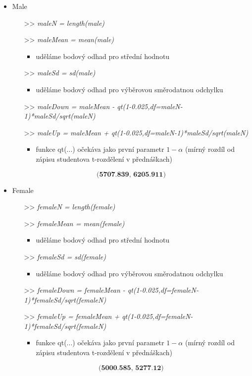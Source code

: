 \documentclass[paper=a4, fontsize=12pt]{scrartcl}
\numberwithin{equation}{section}		%
\numberwithin{figure}{section}			%
\numberwithin{table}{section}				%
\begin{document}
\begin{itemize}
	\item Male
	\begin{itemize}
		\item[>>]\textit{ maleN = length(male)}
		\item[>>]\textit{ maleMean = mean(male)}
		\begin{itemize}
			\item uděláme bodový odhad pro střední hodnotu	
		\end{itemize}
		\item[>>]\textit{ maleSd = sd(male)}
		\begin{itemize}
			\item uděláme bodový odhad pro výběrovou směrodatnou odchylku 
		\end{itemize}
		\item[>>]\textit{maleDown = maleMean - qt(1-0.025,df=maleN-1)*maleSd/sqrt(maleN)} 
		\item[>>]\textit{ maleUp = maleMean + qt(1-0.025,df=maleN-1)*maleSd/sqrt(maleN)}
		\begin{itemize}
			\item funkce qt(...) očekáva jako první parametr \(1 - \alpha\) (mírný rozdíl od zápisu studentova t-rozdělení v přednáškach)    
		\end{itemize}
	\end{itemize}
	
	\[
	 \textbf{(5707.839, 6205.911)}
	\]

	\item Female
	\begin{itemize}
	\item[>>]\textit{ femaleN = length(female)}
	\item[>>]\textit{ femaleMean = mean(female)}
	\begin{itemize}
		\item uděláme bodový odhad pro střední hodnotu	
	\end{itemize}
	\item[>>]\textit{ femaleSd = sd(female)}
	\begin{itemize}
		\item uděláme bodový odhad pro výběrovou směrodatnou odchylku 
	\end{itemize}
	\item[>>]\textit{femaleDown = femaleMean - qt(1-0.025,df=femaleN-1)*femaleSd/sqrt(femaleN)} 
	\item[>>]\textit{ femaleUp = femaleMean + qt(1-0.025,df=femaleN-1)*femaleSd/sqrt(femaleN)}
	\begin{itemize}
		\item funkce qt(...) očekáva jako první parametr \(1 - \alpha\) (mírný rozdíl od zápisu studentova t-rozdělení v přednáškach)    
	\end{itemize}
\end{itemize}

\[
\textbf{(5000.585, 5277.12)}
\]
\end{itemize}
\end{document}
